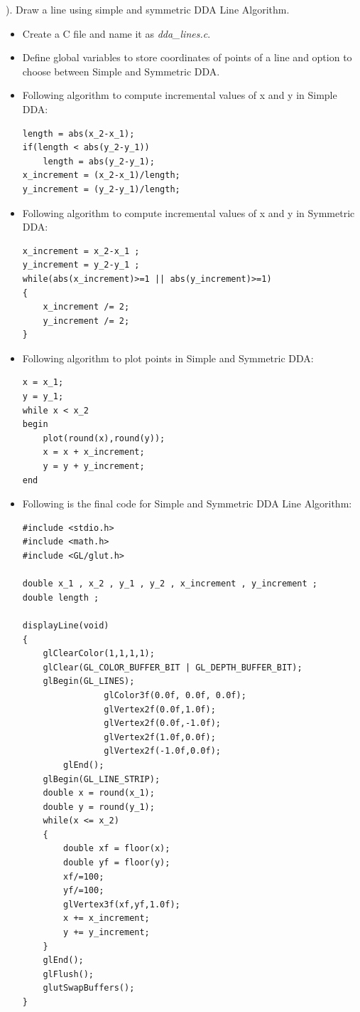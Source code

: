 \vspace{0.5mm} ). Draw a line using simple and symmetric DDA Line Algorithm.
\begin{itemize}
\item Create a C file and name it as \textit{dda\_lines.c}.

\item Define global variables to store coordinates of points of a line and option to choose between Simple and Symmetric DDA.

\item Following algorithm to compute incremental values of x and y in Simple DDA:

\begin{lstlisting}
length = abs(x_2-x_1);
if(length < abs(y_2-y_1))
	length = abs(y_2-y_1);
x_increment = (x_2-x_1)/length;
y_increment = (y_2-y_1)/length;
\end{lstlisting}

\item Following algorithm to compute incremental values of x and y in Symmetric DDA:

\begin{lstlisting}
x_increment = x_2-x_1 ;
y_increment = y_2-y_1 ;
while(abs(x_increment)>=1 || abs(y_increment)>=1)
{
	x_increment /= 2;
	y_increment /= 2;
}
\end{lstlisting}

\item Following algorithm to plot points in Simple and Symmetric DDA:

\begin{lstlisting}
x = x_1;
y = y_1;
while x < x_2
begin
	plot(round(x),round(y));
	x = x + x_increment;
	y = y + y_increment;
end
\end{lstlisting}

\item Following is the final code for Simple and Symmetric DDA Line Algorithm:
\begin{lstlisting}
#include <stdio.h>
#include <math.h>
#include <GL/glut.h>

double x_1 , x_2 , y_1 , y_2 , x_increment , y_increment ;
double length ;

displayLine(void)
{
	glClearColor(1,1,1,1);
	glClear(GL_COLOR_BUFFER_BIT | GL_DEPTH_BUFFER_BIT);
	glBegin(GL_LINES);
                glColor3f(0.0f, 0.0f, 0.0f);
                glVertex2f(0.0f,1.0f);
                glVertex2f(0.0f,-1.0f);
                glVertex2f(1.0f,0.0f);
                glVertex2f(-1.0f,0.0f);
        glEnd();
	glBegin(GL_LINE_STRIP);
	double x = round(x_1);
	double y = round(y_1);
	while(x <= x_2)
	{
		double xf = floor(x);
		double yf = floor(y);
		xf/=100;
		yf/=100;
		glVertex3f(xf,yf,1.0f);
		x += x_increment;
		y += y_increment;
	}
	glEnd();
	glFlush();
	glutSwapBuffers();
}


\end{lstlisting}
\end{itemize}
